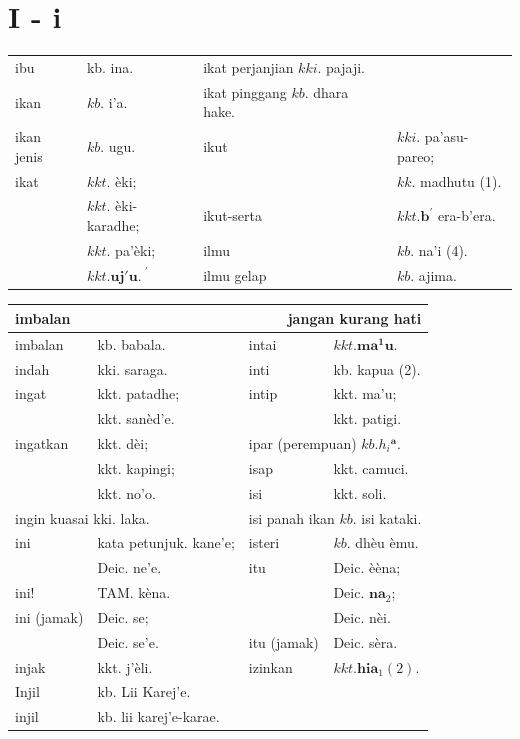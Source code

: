 \documentclass[10pt]{article}
\begin{document}
\section*{I - i}
\begin{center}
\begin{tabular}{llll}
ibu & kb. ina. & ikat perjanjian \(k k i\). pajaji. &  \\
ikan & \(k b\). i'a. & ikat pinggang \(k b\). dhara hake. &  \\
ikan jenis & \(k b\). ugu. & ikut & \(k k i\). pa'asu-pareo; \\
ikat & \(k k t\). èki; &  & \(k k\). madhutu (1). \\
 & \(k k t\). èki-karadhe; & ikut-serta & \(k k t . \mathbf{b}^{\prime}\) era-b'era. \\
 & \(k k t\). pa'èki; & ilmu & \(k b\). na'i (4). \\
 & \(k k t . \mathbf{u j ' u . ~}^{\prime}\) & ilmu gelap & \(k b\). ajima. \\
\end{tabular}
\end{center}

\begin{center}
\begin{tabular}{|l|l|l|l|}
\hline
\multicolumn{2}{|l|}{imbalan} & \multicolumn{2}{|r|}{jangan kurang hati} \\
\hline
imbalan & kb. babala. & intai & \(k k t . \mathbf{m} \mathbf{a}^{\mathbf{1}} \mathbf{u}\). \\
\hline
indah & kki. saraga. & inti & kb. kapua (2). \\
\hline
ingat & kkt. patadhe; & intip & kkt. ma'u; \\
\hline
 & kkt. sanèd'e. &  & kkt. patigi. \\
\hline
ingatkan & kkt. dèi; & \multicolumn{2}{|l|}{ipar (perempuan) \(k b . h_{i}{ }^{\mathbf{a}}\).} \\
\hline
 & kkt. kapingi; & isap & kkt. camuci. \\
\hline
 & kkt. no'o. & isi & kkt. soli. \\
\hline
\multicolumn{2}{|l|}{ingin kuasai kki. laka.} & \multicolumn{2}{|l|}{isi panah ikan \(k b\). isi kataki.} \\
\hline
ini & kata petunjuk. kane'e; & isteri & \(k b\). dhèu èmu. \\
\hline
 & Deic. ne'e. & itu & Deic. èèna; \\
\hline
ini! & TAM. kèna. &  & Deic. \(\mathbf{n} \mathbf{a}_{2}\); \\
\hline
ini (jamak) & Deic. se; &  & Deic. nèi. \\
\hline
 & Deic. se'e. & itu (jamak) & Deic. sèra. \\
\hline
injak & kkt. j'èli. & izinkan & \(k k t . \mathbf{h i a}_{1}(2)\). \\
\hline
Injil & kb. Lii Karej'e. &  &  \\
\hline
injil & kb. lii karej'e-karae. &  &  \\
\hline
\end{tabular}
\end{center}
\end{document}
